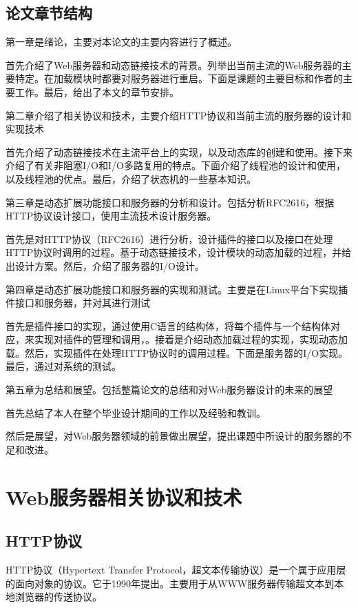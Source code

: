 \documentclass[twoside, xetex]{report}
\begin{document}
\section{论文章节结构}
	第一章是绪论，主要对本论文的主要内容进行了概述。
	
	首先介绍了Web服务器和动态链接技术的背景。列举出当前主流的Web服务器的主要特定。在加载模块时都要对服务器进行重启。下面是课题的主要目标和作者的主要工作。最后，给出了本文的章节安排。
	
	第二章介绍了相关协议和技术，主要介绍HTTP协议和当前主流的服务器的设计和实现技术
	
		首先介绍了动态链接技术在主流平台上的实现，以及动态库的创建和使用。接下来介绍了有关非阻塞I/O和I/O多路复用的特点。下面介绍了线程池的设计和使用，以及线程池的优点。最后，介绍了状态机的一些基本知识。
		
	第三章是动态扩展功能接口和服务器的分析和设计。包括分析RFC2616，根据HTTP协议设计接口，使用主流技术设计服务器。
	
		首先是对HTTP协议（RFC2616）进行分析，设计插件的接口以及接口在处理HTTP协议时调用的过程。基于动态链接技术，设计模块的动态加载的过程，并给出设计方案。然后，介绍了服务器的I/O设计。
	
	第四章是动态扩展功能接口和服务器的实现和测试。主要是在Linux平台下实现插件接口和服务器，并对其进行测试
	
		首先是插件接口的实现，通过使用C语言的结构体，将每个插件与一个结构体对应，来实现对插件的管理和调用，。接着是介绍动态加载过程的实现，实现动态加载。然后，实现插件在处理HTTP协议时的调用过程。下面是服务器的I/O实现。最后，通过对系统的测试。
		
	第五章为总结和展望。包括整篇论文的总结和对Web服务器设计的未来的展望
	
	首先总结了本人在整个毕业设计期间的工作以及经验和教训。
		
	然后是展望，对Web服务器领域的前景做出展望，提出课题中所设计的服务器的不足和改进。
	
\chapter{Web服务器相关协议和技术}

\section{HTTP协议}
	HTTP协议（Hypertext Transfer Protocol，超文本传输协议）是一个属于应用层的面向对象的协议。它于1990年提出。主要用于从WWW服务器传输超文本到本地浏览器的传送协议。
	
\end{document}

